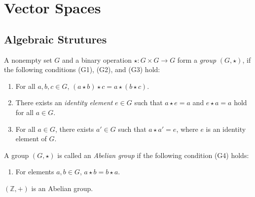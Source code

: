 \chapter{Vector Spaces}
\section{Algebraic Strutures}
\begin{definition}
  A nonempty set $G$ and a binary operation $\star: G \times G \to G$
  form a \emph{group} $(G, \star)$, if the following conditions
  (G1), (G2), and (G3) hold:
  \begin{enumerate}[(G1)]
    \item For all $a, b, c \in G$,
      $(a \star b) \star c = a \star (b \star c)$.
    \item There exists an \emph{identity element} $e \in G$ such that
      $a \star e = a$ and $e \star a = a$ hold for all $a \in G$. 
    \item For all $a \in G$, there exists $a' \in G$ such that
      $a \star a' = e$, where $e$ is an identity element of $G$.
  \end{enumerate}
\end{definition}
\begin{definition}
  A group $(G, \star)$ is called an \emph{Abelian group} if the following
  condition (G4) holds:
  \begin{enumerate}[(G1),start=4]
    \item For elements $a, b \in G$, $a \star b = b \star a$.
  \end{enumerate}
\end{definition}
\begin{example}
  $(\mathbb{Z}, +)$ is an Abelian group.
\end{example}
